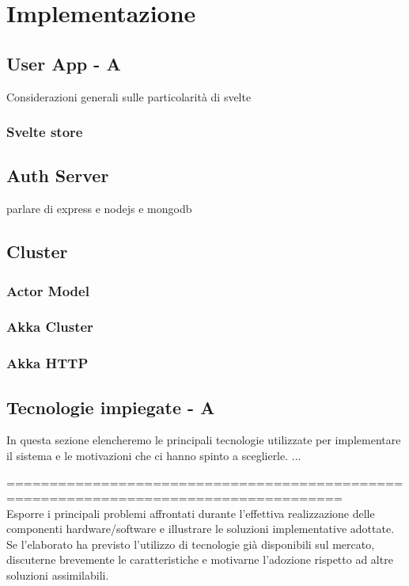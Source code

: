 

\section{Implementazione}\label{sec:implementazione}


\subsection{User App - A}

Considerazioni generali sulle particolarità di svelte
\subsubsection{Svelte store}
\subsection{Auth Server}
parlare di express e nodejs e mongodb

\subsection{Cluster}
\subsubsection{Actor Model}
\subsubsection{Akka Cluster}
\subsubsection{Akka HTTP}

\subsection{Tecnologie impiegate - A}
In questa sezione elencheremo le principali tecnologie utilizzate per implementare il sistema e le motivazioni che ci hanno spinto a sceglierle.
...

===================================================================================== \\
Esporre i principali problemi affrontati durante l'effettiva realizzazione delle componenti hardware/software e illustrare le soluzioni implementative adottate. Se l'elaborato ha previsto l'utilizzo di tecnologie già disponibili sul mercato, discuterne brevemente le caratteristiche e motivarne l'adozione rispetto ad altre soluzioni assimilabili.\\

